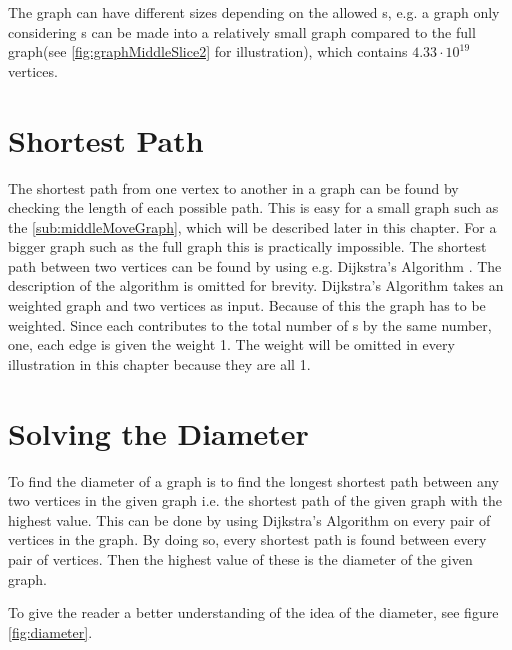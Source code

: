 The \rubik{} graph can have different sizes depending on the allowed \twist{}s, e.g. a graph only considering  \twist{}s can be made into a relatively small graph compared to the full \rubik{} graph(see \ref{fig:graphMiddleSlice2} for illustration), which contains $4.33 \cdot 10^{19}$ vertices.


\section{Shortest Path}
The shortest path from one vertex to another in a graph can be found by checking the length of each possible path. 
This is easy for a small graph such as the  \ref{sub:middleMoveGraph}, which will be described later in this chapter. For a bigger graph such as the full \rubik{} graph this is practically impossible. 
The shortest path between two vertices can be found by using e.g. Dijkstra's Algorithm \cite[p. 651]{Rosen07}. The description of the algorithm is omitted for brevity. Dijkstra's Algorithm takes an weighted graph and two vertices as input. 
Because of this the \rubik{} graph has to be weighted. Since each \twist{} contributes to the total number of \twist{}s by the same number, one, each edge is given the weight 1. The weight will be omitted in every illustration in this chapter because they are all 1.  

\section{Solving the Diameter}
To find the diameter of a graph is to find the longest shortest path between any two vertices in the given graph i.e. the shortest path of the given graph with the highest value. 
This can be done by using Dijkstra's Algorithm on every pair of vertices in the graph.
By doing so, every shortest path is found between every pair of vertices.
Then the highest value of these is the diameter of the given graph.

To give the reader a better understanding of the idea of the diameter, see figure \ref{fig:diameter}.

